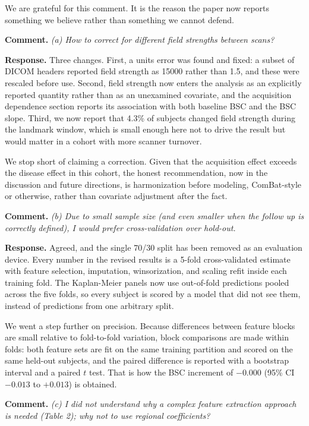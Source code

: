 \documentclass[11pt]{article}
\newcommand{\comment}[1]{\vspace{6pt}\noindent\textbf{Comment.} \textit{#1}\par\vspace{2pt}}
\newcommand{\response}{\noindent\textbf{Response.} }
\begin{document}
We are grateful for this comment. It is the reason the paper now reports something we believe rather than something we cannot defend.

\comment{(a) How to correct for different field strengths between scans?}

\response Three changes. First, a units error was found and fixed: a subset of DICOM headers reported field strength as 15000 rather than 1.5, and these were rescaled before use. Second, field strength now enters the analysis as an explicitly reported quantity rather than as an unexamined covariate, and the acquisition dependence section reports its association with both baseline BSC and the BSC slope. Third, we now report that 4.3\% of subjects changed field strength during the landmark window, which is small enough here not to drive the result but would matter in a cohort with more scanner turnover.

We stop short of claiming a correction. Given that the acquisition effect exceeds the disease effect in this cohort, the honest recommendation, now in the discussion and future directions, is harmonization before modeling, ComBat-style or otherwise, rather than covariate adjustment after the fact.

\comment{(b) Due to small sample size (and even smaller when the follow up is correctly defined), I would prefer cross-validation over hold-out.}

\response Agreed, and the single 70/30 split has been removed as an evaluation device. Every number in the revised results is a 5-fold cross-validated estimate with feature selection, imputation, winsorization, and scaling refit inside each training fold. The Kaplan-Meier panels now use out-of-fold predictions pooled across the five folds, so every subject is scored by a model that did not see them, instead of predictions from one arbitrary split.

We went a step further on precision. Because differences between feature blocks are small relative to fold-to-fold variation, block comparisons are made within folds: both feature sets are fit on the same training partition and scored on the same held-out subjects, and the paired difference is reported with a bootstrap interval and a paired $t$ test. That is how the BSC increment of $-0.000$ (95\% CI $-0.013$ to $+0.013$) is obtained.

\comment{(c) I did not understand why a complex feature extraction approach is needed (Table 2); why not to use regional coefficients?}
\end{document}
